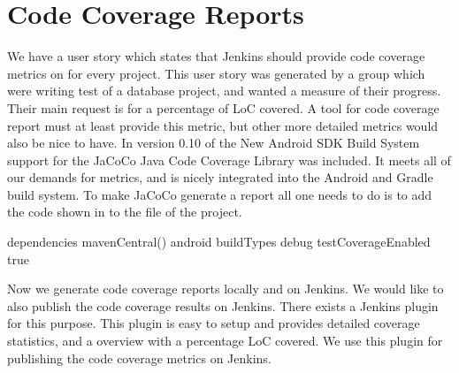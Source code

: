 \section{Code Coverage Reports}

We have a user story which states that Jenkins should provide code coverage metrics on for every project. This user story was generated by a group which were writing test of a database project, and wanted a measure of their progress. Their main request is for a percentage of LoC covered. A tool for code coverage report must at least provide this metric, but other more detailed metrics would also be nice to have. In version 0.10 of the New Android SDK Build System\parencite{new-build-android} support for the JaCoCo\parencite{jacoco-home} Java Code Coverage Library was included. It meets all of our demands for metrics, and is nicely integrated into the Android and Gradle build system. 
To make JaCoCo generate a report all one needs to do is to add the code shown in  to the  file of the project. 
\begin{gradlecode}[caption=Gradle script for enabling JaCoCo.,label=lst:Jacoco]
dependencies {
    mavenCentral()
}
android {
    buildTypes {
        debug {
            testCoverageEnabled true
        }
    }
}
\end{gradlecode}{}
Now we generate code coverage reports locally and on Jenkins. We would like to also publish the code coverage results on Jenkins. There exists a Jenkins plugin for this purpose\parencite{jacoco-jenkins-plugin}. This plugin is easy to setup and provides detailed coverage statistics, and a overview with a percentage LoC covered. We use this plugin for publishing the code coverage metrics on Jenkins.
